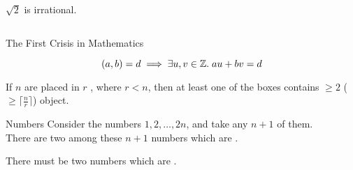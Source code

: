 
\begin{frame}{}
  \begin{theorem}
    $\sqrt{2}$ is irrational.
  \end{theorem}

  \begin{columns}
  \end{columns}
  \begin{center}
    The First Crisis in Mathematics
  \end{center}
\end{frame}

\begin{frame}{}
  \begin{theorem}
    \[
      (a, b) = d \implies \exists u, v \in \mathbb{Z}.\; au + bv = d
    \]
  \end{theorem}
\end{frame}

\begin{frame}{}

  \begin{theorem}
    If $n$  are placed in $r$ , where $r < n$,
    then at least one of the boxes contains $\ge 2$
    ($\ge \lceil \frac{n}{r} \rceil$) object.
  \end{theorem}
\end{frame}

\begin{frame}{}
  \begin{exampleblock}{Numbers}
    Consider the numbers $1, 2, \dots, 2n$, and take any $n+1$ of them. \\
    There are two among these $n+1$ numbers which are .
  \end{exampleblock}

  \pause
  \vspace{0.30cm}
  \begin{center}
    There must be two numbers which are .
  \end{center}
\end{frame}

